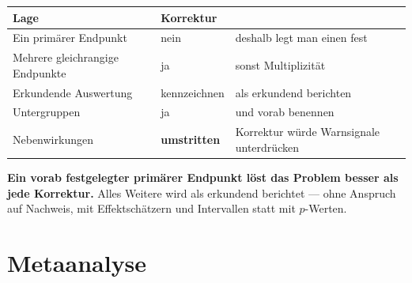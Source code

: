 \begin{warnung}
\begin{center}
{\small
\renewcommand{\arraystretch}{1.5}
\begin{tabular}{@{}P{3.0cm}P{2.0cm}P{3.0cm}@{}}
\toprule
\textbf{Lage} & \textbf{Korrektur} & \\
\midrule
Ein primärer Endpunkt & \textcolor{gruen}{nein} & deshalb legt man einen fest\\
Mehrere gleich\-rangige Endpunkte & \textcolor{akzent}{ja} & sonst Multiplizität\\
Erkundende Auswertung & \textcolor{mittel}{kenn\-zeichnen} & als erkundend berichten\\
Untergruppen & \textcolor{akzent}{ja} & und vorab benennen\\
Nebenwirkungen & \textcolor{mittel}{\textbf{umstritten}} & \textcolor{mittel}{Korrektur würde Warnsignale unterdrücken}\\
\bottomrule
\end{tabular}}
\end{center}

\begin{center}
\begin{minipage}{0.88\textwidth}
\end{minipage}
\end{center}

\begin{center}
\begin{minipage}{0.9\textwidth}
\textbf{Ein vorab festgelegter primärer Endpunkt löst das Problem besser als jede Korrektur.} Alles Weitere wird als erkundend berichtet --- ohne Anspruch auf Nachweis, mit Effektschätzern und Intervallen statt mit $p$-Werten.
\end{minipage}
\end{center}
\end{warnung}

\section{Metaanalyse}

